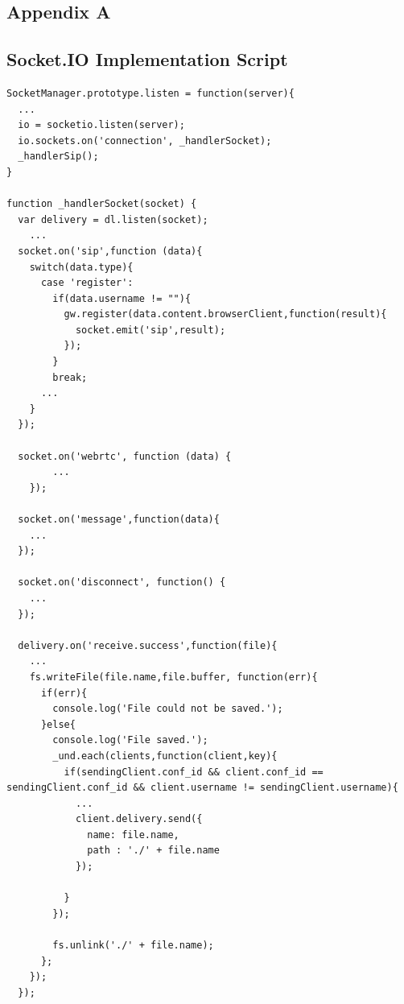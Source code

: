 \appendix
{}
 \renewcommand{\chaptername}{\appendixname}

\begin{appendices}

\chapter{Appendix A}

\section{Socket.IO Implementation Script}
\label{server:socket}

\begin{lstlisting}[caption={socket.js on Application Server},label={code:server_socket}]
SocketManager.prototype.listen = function(server){
  ...
  io = socketio.listen(server);
  io.sockets.on('connection', _handlerSocket);
  _handlerSip();
}

function _handlerSocket(socket) {
  var delivery = dl.listen(socket);
    ...
  socket.on('sip',function (data){
    switch(data.type){
      case 'register':
        if(data.username != ""){
          gw.register(data.content.browserClient,function(result){
            socket.emit('sip',result);
          });
        }
        break;
      ...
    }
  });

  socket.on('webrtc', function (data) {
        ...  
    });

  socket.on('message',function(data){
    ...
  });

  socket.on('disconnect', function() {
    ...
  });

  delivery.on('receive.success',function(file){
    ...
    fs.writeFile(file.name,file.buffer, function(err){
      if(err){
        console.log('File could not be saved.');
      }else{
        console.log('File saved.');
        _und.each(clients,function(client,key){
          if(sendingClient.conf_id && client.conf_id == sendingClient.conf_id && client.username != sendingClient.username){
            ...
            client.delivery.send({
              name: file.name,
              path : './' + file.name
            });

          }
        });

        fs.unlink('./' + file.name);
      };
    });
  });


\end{lstlisting}
\end{appendices}

